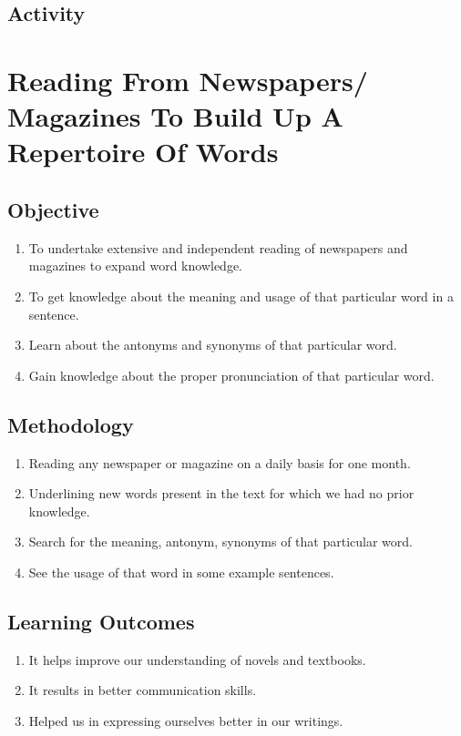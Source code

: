 \subsection{Activity}
\pagebreak

\section{Reading From Newspapers/ Magazines To Build Up A Repertoire Of Words}
\label{Reading From Newspapers/ Magazines To}
\subsection{Objective}
\begin{enumerate}
    \item To undertake extensive and independent reading of newspapers and magazines to
          expand word knowledge.
    \item To get knowledge about the meaning and usage of that particular word in a sentence.
    \item Learn about the antonyms and synonyms of that particular word.
    \item Gain knowledge about the proper pronunciation of that particular word.
\end{enumerate}

\subsection{Methodology}
\begin{enumerate}
    \item Reading any newspaper or magazine on a daily basis for one month.
    \item Underlining new words present in the text for which we had no prior knowledge.
    \item Search for the meaning, antonym, synonyms of that particular word.
    \item See the usage of that word in some example sentences.
\end{enumerate}

\subsection{Learning Outcomes}
\begin{enumerate}
    \item It helps improve our understanding of novels and textbooks.
    \item It results in better communication skills.
    \item Helped us in expressing ourselves better in our writings.
\end{enumerate}

